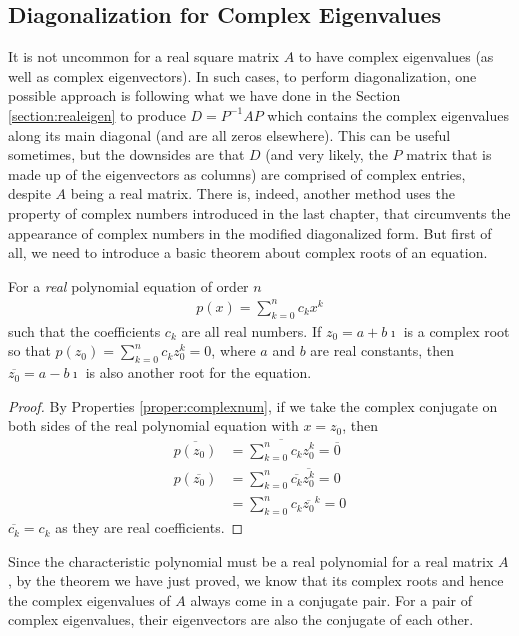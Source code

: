 \subsection{Diagonalization for Complex Eigenvalues}
It is not uncommon for a real square matrix $A$ to have complex eigenvalues (as well as complex eigenvectors). In such cases, to perform diagonalization, one possible approach is following what we have done in the Section \ref{section:realeigen} to produce $D = P^{-1}AP$ which contains the complex eigenvalues along its main diagonal (and are all zeros elsewhere). This can be useful sometimes, but the downsides are that $D$ (and very likely, the $P$ matrix that is made up of the eigenvectors as columns) are comprised of complex entries, despite $A$ being a real matrix. There is, indeed, another method uses the property of complex numbers introduced in the last chapter, that circumvents the appearance of complex numbers in the modified diagonalized form. But first of all, we need to introduce a basic theorem about complex roots of an equation.
\begin{thm}
For a \textit{real} polynomial equation of order $n$
\begin{align*}
p(x) = \sum_{k=0}^{n} c_k x^k
\end{align*}
such that the coefficients $c_k$ are all real numbers. If $z_0 = a+b\imath$ is a complex root so that $p(z_0) = \sum_{k=0}^{n} c_k z_0^k = 0$, where $a$ and $b$ are real constants, then
$\overline{z_0} = a-b\imath$ is also another root for the equation.
\end{thm}
\begin{proof}
By Properties \ref{proper:complexnum}, if we take the complex conjugate on both sides of the real polynomial equation with $x = z_0$, then
\begin{align*}
\overline{p(z_0)} &= \overline{\sum_{k=0}^{n} c_k z_0^k} = \overline{0} \\
{p(\overline{z_0})} &= \sum_{k=0}^{n} \overline{c_k} \overline{z_0^k} = 0 \\
&= \sum_{k=0}^{n} c_k \overline{z_0}^k = 0
\end{align*}
$\overline{c_k} = c_k$ as they are real coefficients.
\end{proof}
Since the characteristic polynomial must be a real polynomial for a real matrix $A$, by the theorem we have just proved, we know that its complex roots and hence the complex eigenvalues of $A$ always come in a conjugate pair. For a pair of complex eigenvalues, their eigenvectors are also the conjugate of each other.
